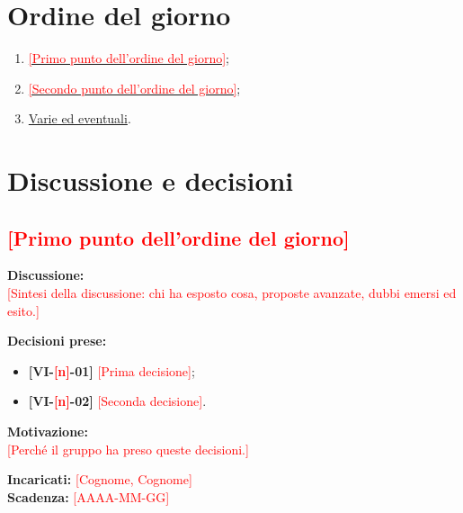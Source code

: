 \documentclass[12pt,a4paper]{article}
\newcommand{\vnum}{\ph{n}}                     %
\newcommand{\ph}[1]{\textcolor{red}{[#1]}}                        %
\newcommand{\tightlist}{\setlength{\itemsep}{1pt}\setlength{\parskip}{0pt}}
\begin{document}
\hypertarget{ordine-del-giorno}{%
\section{Ordine del giorno}}

\begin{enumerate}
\tightlist
\item \hyperlink{odg-1}{\ph{Primo punto dell'ordine del giorno}};
\item \hyperlink{odg-2}{\ph{Secondo punto dell'ordine del giorno}};
\item \hyperlink{varie-ed-eventuali}{Varie ed eventuali}.
\end{enumerate}
\newpage

\hypertarget{discussione-e-decisioni}{%
\section{Discussione e decisioni}}

\hypertarget{odg-1}{%
\subsection{\ph{Primo punto dell'ordine del giorno}}}

\textbf{Discussione:}\\
\ph{Sintesi della discussione: chi ha esposto cosa, proposte avanzate, dubbi emersi ed esito.}

\textbf{Decisioni prese:}
\begin{itemize}
\tightlist
\item[$\checkmark$] \textbf{[VI-\vnum-01]} \ph{Prima decisione};
\item[$\checkmark$] \textbf{[VI-\vnum-02]} \ph{Seconda decisione}.
\end{itemize}

\textbf{Motivazione:}\\
\ph{Perché il gruppo ha preso queste decisioni.}

\textbf{Incaricati:} \ph{Cognome, Cognome}\\
\textbf{Scadenza:} \ph{AAAA-MM-GG}
\end{document}

